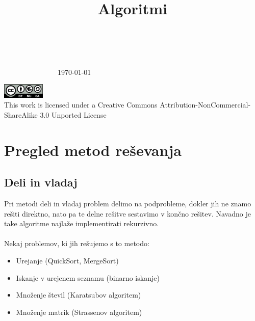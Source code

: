\documentclass[10pt,a4paper,oneside]{book}
\title{Algoritmi}
\newenvironment{items}{
\begin{itemize}
  \setlength{\itemsep}{1pt}
  \setlength{\parskip}{0pt}
  \setlength{\parsep}{0pt}
}{\end{itemize}}
\begin{document}
\begin{titlepage}
\begin{center}
\ \\[5cm]
{}\\[-16pt]
{\ \ \ \ \ \ \ \ \ \ \ \ \ \ \ \huge \today}


\vfill
\parbox{7.5cm}{
\begin{center}
\includegraphics[width=0.15\textwidth]{./by-nc-sa}\\[6pt]

This work is licensed under a Creative Commons Attribution-NonCommercial-ShareAlike 3.0 Unported License
\end{center}
}

\end{center}
\end{titlepage}
\tableofcontents
\pagebreak
\chapter{Pregled metod reševanja}
\section{Deli in vladaj}
Pri metodi deli in vladaj problem delimo na podprobleme, dokler jih ne znamo rešiti direktno, nato pa te delne rešitve sestavimo v končno rešitev. Navadno je take algoritme najlaže implementirati rekurzivno.\\
 \\
Nekaj problemov, ki jih rešujemo s to metodo:
\begin{items}
	\item Urejanje (QuickSort, MergeSort)
	\item Iskanje v urejenem seznamu (binarno iskanje)
	\item Množenje števil (Karatsubov algoritem)
	\item Množenje matrik (Strassenov algoritem)
\end{items}
\end{document}
